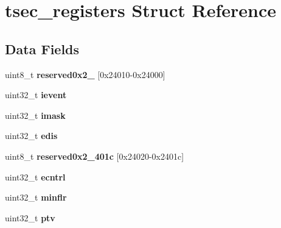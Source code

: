\hypertarget{structtsec__registers}{}\section{tsec\+\_\+registers Struct Reference}
\label{structtsec__registers}
\subsection*{Data Fields}
\begin{DoxyCompactItemize}
\item 
\mbox{\label{structtsec__registers_a0474a87ec26d389b829a41042796de4a}} 
uint8\+\_\+t {\bfseries reserved0x2\+\_} \mbox{[}0x24010-\/0x24000\mbox{]}
\item 
\mbox{\label{structtsec__registers_a7098b4ef2edc08dd98d221fd2ffb9165}} 
uint32\+\_\+t {\bfseries ievent}
\item 
\mbox{\label{structtsec__registers_a92837c0050489e6e629a9a02247d07ba}} 
uint32\+\_\+t {\bfseries imask}
\item 
\mbox{\label{structtsec__registers_ac45d5cf5cff2aeb7bf9d172dac9f5906}} 
uint32\+\_\+t {\bfseries edis}
\item 
\mbox{\label{structtsec__registers_a40f6f2cd01279341dfedfbc89c918cd6}} 
uint8\+\_\+t {\bfseries reserved0x2\+\_\+401c} \mbox{[}0x24020-\/0x2401c\mbox{]}
\item 
\mbox{\label{structtsec__registers_a21094d988bafb7c67c1e8ec51e92f0ba}} 
uint32\+\_\+t {\bfseries ecntrl}
\item 
\mbox{\label{structtsec__registers_a35dbf72b82a9907251dc1c2473d3b0a3}} 
uint32\+\_\+t {\bfseries minflr}
\item 
\mbox{\label{structtsec__registers_a1f6965d2ea6d869101303de10c290801}} 
uint32\+\_\+t {\bfseries ptv}
\item 
\mbox{\label{structtsec__registers_aa8a7fae4b735e52c4be1ca35e9d8beab}} 

\end{DoxyCompactItemize}
